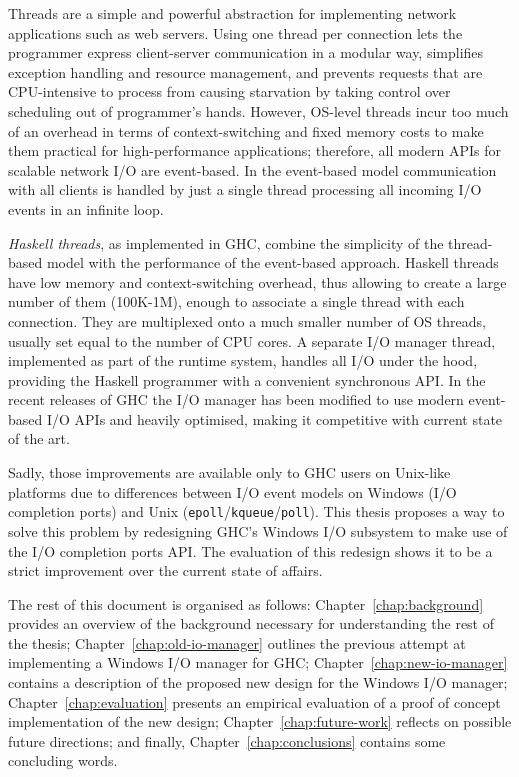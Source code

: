 \documentclass[a4paper,11pt,oneside]{report}
\begin{document}
Threads are a simple and powerful abstraction for implementing network
applications such as web servers. Using one thread per connection lets the
programmer express client-server communication in a modular way, simplifies
exception handling and resource management, and prevents requests that are
CPU-intensive to process from causing starvation by taking control over
scheduling out of programmer's hands. However, OS-level threads incur too much
of an overhead in terms of context-switching and fixed memory costs to make them
practical for high-performance applications; therefore, all modern APIs for
scalable network I/O are event-based. In the event-based model communication
with all clients is handled by just a single thread processing all incoming I/O
events in an infinite loop.

\textit{Haskell threads}, as implemented in GHC, combine the simplicity of the
thread-based model with the performance of the event-based approach. Haskell
threads have low memory and context-switching overhead, thus allowing to create
a large number of them (100K-1M), enough to associate a single thread with each
connection. They are multiplexed onto a much smaller number of OS threads,
usually set equal to the number of CPU cores. A separate I/O manager thread,
implemented as part of the runtime system, handles all I/O under the hood,
providing the Haskell programmer with a convenient synchronous API. In the
recent releases of GHC the I/O manager has been modified to use modern
event-based I/O APIs and heavily optimised, making it competitive with current
state of the art.

Sadly, those improvements are available only to GHC users on Unix-like platforms
due to differences between I/O event models on Windows (I/O completion ports)
and Unix (\texttt{epoll}/\texttt{kqueue}/\texttt{poll}). This thesis proposes a
way to solve this problem by redesigning GHC's Windows I/O subsystem to make use
of the I/O completion ports API. The evaluation of this redesign shows it to be
a strict improvement over the current state of affairs.

The rest of this document is organised as follows: Chapter~\ref{chap:background}
provides an overview of the background necessary for understanding the rest of
the thesis; Chapter~\ref{chap:old-io-manager} outlines the previous attempt at
implementing a Windows I/O manager for GHC; Chapter~\ref{chap:new-io-manager}
contains a description of the proposed new design for the Windows I/O manager;
Chapter~\ref{chap:evaluation} presents an empirical evaluation of a proof of
concept implementation of the new design; Chapter~\ref{chap:future-work}
reflects on possible future directions; and finally,
Chapter~\ref{chap:conclusions} contains some concluding words.
\end{document}
